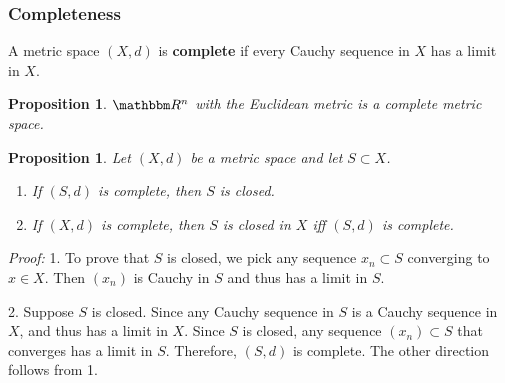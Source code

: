 \documentclass[9pt,aspectratio=169]{beamer}
\newcommand{\RR}{\mathbbm R}
\newtheorem{proposition}[theorem]{Proposition}
\begin{document}
\begin{frame}[allowframebreaks]
    \frametitle{Completeness}
    \begin{definition}
        A metric space $(X, d)$ is \textbf{complete} if every Cauchy sequence
        in $X$ has a limit in $X$.
    \end{definition}

    \begin{proposition}
        $\RR^n$ with the Euclidean metric is a complete metric space.
    \end{proposition}
    \framebreak
    \begin{proposition}
        Let $(X, d)$ be a metric space and let $S \subset X$.
        \begin{enumerate}
            \item If $(S, d)$ is complete, then $S$ is closed.
            \item If $(X, d)$ is complete, then $S$ is closed in $X$ iff $(S,
            d)$ is complete.
        \end{enumerate}
    \end{proposition}
    \emph{Proof:} 1. To prove that $S$ is closed, we pick any sequence $x_n
    \subset S$ converging to $x \in X$. Then $(x_n)$ is Cauchy in $S$ and
    thus has a limit in $S$.

    2. Suppose $S$ is closed. Since any Cauchy sequence in $S$ is a Cauchy
    sequence in $X$, and thus has a limit in $X$. Since $S$ is closed, any
    sequence $(x_n) \subset S$ that converges has a limit in $S$. Therefore,
    $(S, d)$ is complete. The other direction follows from 1.
\end{frame}
\end{document}
